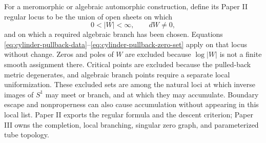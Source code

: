 For a meromorphic or algebraic automorphic construction, define its Paper II
regular locus to be the union of open sheets on which
\begin{equation}\label{eq:automorphic-regular-locus}
 0<|W|<\infty,
 \qquad
 dW\ne0,
\end{equation}
and on which a required algebraic branch has been chosen.  Equations
\eqref{eq:cylinder-pullback-data}--\eqref{eq:cylinder-pullback-zero-set} apply on
that locus without change.  Zeros and poles of \(W\) are excluded because
\(\log|W|\) is not a finite smooth assignment there.  Critical points are excluded
because the pulled-back metric degenerates, and algebraic branch points require a
separate local uniformization.  These excluded sets are among the natural loci at
which inverse images of \(S^1\) may meet or branch, and at which they may
accumulate.
Boundary escape and nonproperness can also cause accumulation without appearing
in this local list.  Paper II exports the regular formula and the descent criterion;
Paper III owns the completion, local branching, singular zero graph, and
parameterized tube topology.
